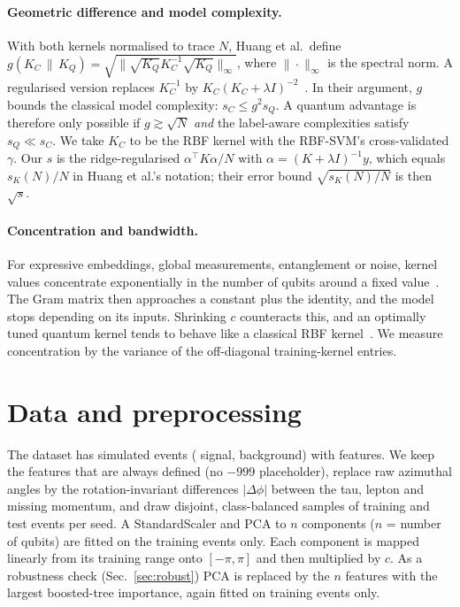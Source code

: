 \documentclass[10pt,a4paper]{article}
\newcommand{\gC}{g(K_C\,\|\,K_Q)}
\begin{document}
\paragraph{Geometric difference and model complexity.}
With both kernels normalised to trace $N$, Huang et al.\ define $\gC=\sqrt{\|\sqrt{K_Q}K_C^{-1}\sqrt{K_Q}\|_\infty}$,
where $\|\cdot\|_\infty$ is the spectral norm. A regularised version replaces $K_C^{-1}$ by
$K_C(K_C+\lambda I)^{-2}$~\cite{huang2021power}. In their argument, $g$ bounds the classical model complexity:
$s_C\le g^2 s_Q$. A quantum advantage is therefore only possible if $g\gtrsim\sqrt{N}$ \emph{and} the label-aware
complexities satisfy $s_Q\ll s_C$. We take $K_C$ to be the RBF kernel with the RBF-SVM's cross-validated $\gamma$.
Our $s$ is the ridge-regularised $\alpha^\top K\alpha/N$ with $\alpha=(K+\lambda I)^{-1}y$, which equals
$s_K(N)/N$ in Huang et al.'s notation; their error bound $\sqrt{s_K(N)/N}$ is then $\sqrt{s}$.

\paragraph{Concentration and bandwidth.}
For expressive embeddings, global measurements, entanglement or noise, kernel values concentrate exponentially in the
number of qubits around a fixed value~\cite{thanasilp2024concentration}. The Gram matrix then approaches a constant
plus the identity, and the model stops depending on its inputs. Shrinking $c$ counteracts this, and an optimally tuned
quantum kernel tends to behave like a classical RBF kernel~\cite{shaydulin2022bandwidth,canatar2023bandwidth,
slattery2023numerical,florezablan2025similarity}. We measure concentration by the variance of the off-diagonal
training-kernel entries.

\section{Data and preprocessing}
The dataset has  simulated events ( signal,  background) with
 features. We keep the  features that are always defined (no $-999$ placeholder),
replace raw azimuthal angles by the rotation-invariant differences $|\Delta\phi|$ between the tau, lepton and missing
momentum, and draw disjoint, class-balanced samples of  training and  test events per seed. A
StandardScaler and PCA to $n$ components ($n$ = number of qubits) are fitted on the training events only. Each component
is mapped linearly from its training range onto $[-\pi,\pi]$ and then multiplied by $c$. As a robustness check
(Sec.~\ref{sec:robust}) PCA is replaced by the $n$ features with the largest boosted-tree importance, again fitted on
training events only.
\end{document}
